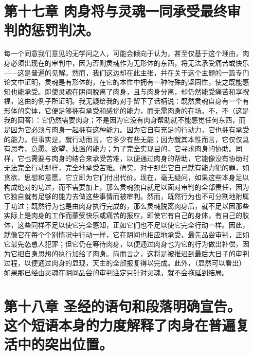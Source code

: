 
\section{第十七章 肉身将与灵魂一同承受最终审判的惩罚判决。}

每一个同意我们意见的无学问之人，可能会倾向于认为，甚至仅基于这个理由，肉身必须出现在的审判中，因为否则灵魂作为无形体的东西，将无法承受痛苦或快乐——这是普遍的见解。然而，我们这边却在此主张，并在关于这个主题的一篇专门论文中证明，灵魂是有形体的，在它的本性中拥有一种特殊的坚固性，使之既能感知也能承受。即使灵魂在阴间脱离了肉身，且与肉身分离，却仍然能受痛苦和享祝福，这由的例子所证明。我无疑给我的对手留下了话柄说：既然灵魂自身有一个有形体的实体，它便足够拥有承受和感觉的能力，而无需肉身的在场。不，不（这是我的回答）：它仍然需要肉身；不是因为它没有肉身帮助就不能感觉任何东西，而是因为它必须与肉身一起拥有这种能力。因为它自有充足的行动力，它也拥有承受的能力。但事实是，就行动而言，它多少有些无能；因为就其本性而言，它仅仅具有思考、意愿、欲望、处置的能力；为了完全实现目的，它寻求肉身的协助。同样，它也需要与肉身的结合来承受苦难，以便通过肉身的帮助，它能像没有协助时无法完全行动那样，完全地承受苦难。确实，对于那些它自己就有能力犯的罪，如贪欲、思想和意愿，它立即为它们付出代价。现在，毫无疑问，如果这些本身足以构成绝对的功过，而不需要加上，那么灵魂独自就足以面对审判的全部责任，因为它独自就有足够的能力去做这些事情而被审判。然而，既然行为也不可分割地附属于功过；既然行为也是由肉身执行完成的，那么灵魂脱离肉身后，就不足以因那些实际上是肉身的工作而蒙受快乐或痛苦的报应，即使它有自己的身体，有自己的肢体，这些同样不足以使它完全感知，正如它们也不足以使它完全行动一样。因此，就像它在每个个别情况中行动一样，它在阴间也相应地承受，最先品尝审判，正如它最先怂恿人犯罪；但它仍在等待肉身，以便通过肉身也为它的行为做出补偿，因为它把自身思想的执行加给了肉身。简而言之，这将是被推迟到最后大日子的审判过程，以便通过肉身的显现，天主的全部报复得以完成。此外，（显然可以看出）如果那已经由灵魂在阴间品尝的审判注定只针对灵魂，就不会拖延到结局。\par


\section{第十八章 圣经的语句和段落明确宣告。这个短语本身的力度解释了肉身在普遍复活中的突出位置。}

